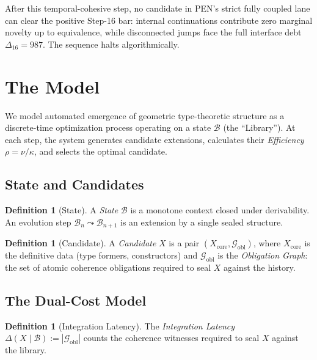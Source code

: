 \documentclass[11pt,a4paper]{article}
\theoremstyle{plain}
\theoremstyle{definition}
\newtheorem{definition}[theorem]{Definition}
\theoremstyle{remark}
\begin{document}
After this temporal-cohesive step, no candidate in PEN's strict fully coupled lane can clear the positive Step-16 bar: internal continuations contribute zero marginal novelty up to equivalence, while disconnected jumps face the full interface debt $\Delta_{16}=987$.
The sequence halts algorithmically.

\section{The Model}
\label{sec:framework}

We model automated emergence of geometric type-theoretic structure as a discrete-time optimization process operating on a state $\mathcal{B}$ (the ``Library'').
At each step, the system generates candidate extensions, calculates their \emph{Efficiency} $\rho = \nu / \kappa$, and selects the optimal candidate.

\subsection{State and Candidates}

\begin{definition}[State]
\label{def:state}
A \emph{State} $\mathcal{B}$ is a monotone context closed under derivability.
An evolution step $\mathcal{B}_n \leadsto \mathcal{B}_{n+1}$ is an extension by a single sealed structure.
\end{definition}

\begin{definition}[Candidate]
\label{def:candidate}
A \emph{Candidate} $X$ is a pair $(X_{\mathrm{core}}, \mathcal{G}_{\mathrm{obl}})$, where $X_{\mathrm{core}}$ is the definitive data (type formers, constructors) and $\mathcal{G}_{\mathrm{obl}}$ is the \emph{Obligation Graph}: the set of atomic coherence obligations required to seal $X$ against the history.
\end{definition}

\subsection{The Dual-Cost Model}

\begin{definition}[Integration Latency]
\label{def:latency}
The \emph{Integration Latency} $\Delta(X \mid \mathcal{B}) := |\mathcal{G}_{\mathrm{obl}}|$ counts the coherence witnesses required to seal $X$ against the library.
\end{definition}
\end{document}
